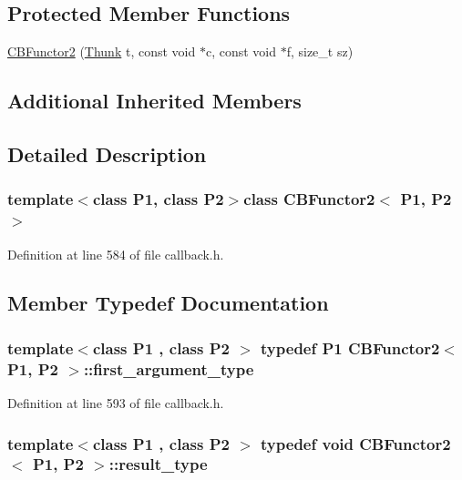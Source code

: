 \subsection*{Protected Member Functions}
\begin{DoxyCompactItemize}
\item 
\hyperlink{class_c_b_functor2_ae7a7a0cb2be8f826dd8bdc377701a0e7}{C\+B\+Functor2} (\hyperlink{class_c_b_functor2_ab4c4da92b06095c821a33b4d7ceab3e1}{Thunk} t, const void $\ast$c, const void $\ast$f, size\+\_\+t sz)
\end{DoxyCompactItemize}
\subsection*{Additional Inherited Members}


\subsection{Detailed Description}
\subsubsection*{template$<$class P1, class P2$>$class C\+B\+Functor2$<$ P1, P2 $>$}



Definition at line 584 of file callback.\+h.



\subsection{Member Typedef Documentation}
\hypertarget{class_c_b_functor2_a0b602135cc723557db0a98baac332f64}{
\subsubsection[{first\+\_\+argument\+\_\+type}]{\setlength{\rightskip}{0pt plus 5cm}template$<$class P1 , class P2 $>$ typedef P1 {\bf C\+B\+Functor2}$<$ P1, P2 $>$\+::{\bf first\+\_\+argument\+\_\+type}}}\label{class_c_b_functor2_a0b602135cc723557db0a98baac332f64}


Definition at line 593 of file callback.\+h.

\hypertarget{class_c_b_functor2_a7043f721c3f7cc64589a88ba678ade59}{
\subsubsection[{result\+\_\+type}]{\setlength{\rightskip}{0pt plus 5cm}template$<$class P1 , class P2 $>$ typedef void {\bf C\+B\+Functor2}$<$ P1, P2 $>$\+::{\bf result\+\_\+type}}}\label{class_c_b_functor2_a7043f721c3f7cc64589a88ba678ade59}


